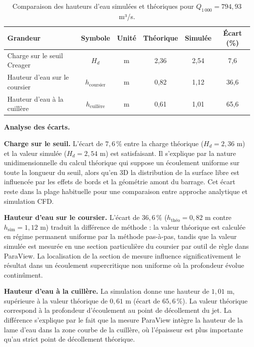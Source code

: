 \begin{table}[H]
\centering
\caption{Comparaison des hauteurs d'eau simulées et théoriques pour $Q_{1\,000} = 794{,}93$ m³/s.}
\label{tab:comparaison_simul_theo}
\renewcommand{\arraystretch}{1.4}
\begin{tabular}{lccccc}
\toprule
\textbf{Grandeur} & \textbf{Symbole} & \textbf{Unité} & \textbf{Théorique} & \textbf{Simulée} & \textbf{Écart (\%)} \\
\midrule
Charge sur le seuil Creager    & $H_d$                     & m & 2,36  & 2,54  &  7,6 \\
Hauteur d'eau sur le coursier  & $h_{\text{coursier}}$     & m & 0,82  & 1,12  & 36,6 \\
Hauteur d'eau à la cuillère    & $h_{\text{cuillère}}$     & m & 0,61  & 1,01  & 65,6 \\
\bottomrule
\end{tabular}
\end{table}

\medskip
\noindent\textbf{Analyse des écarts.}

\medskip
\noindent\textbf{Charge sur le seuil.} L'écart de $7{,}6\,\%$ entre la charge théorique ($H_d = 2{,}36$ m) et la valeur simulée ($H_d = 2{,}54$ m) est satisfaisant. Il s'explique par la nature unidimensionnelle du calcul théorique qui suppose un écoulement uniforme sur toute la longueur du seuil, alors qu'en 3D la distribution de la surface libre est influencée par les effets de bords et la géométrie amont du barrage. Cet écart reste dans la plage habituelle pour une comparaison entre approche analytique et simulation CFD.

\medskip
\noindent\textbf{Hauteur d'eau sur le coursier.} L'écart de $36{,}6\,\%$ ($h_{\text{théo}} = 0{,}82$ m contre $h_{\text{sim}} = 1{,}12$ m) traduit la différence de méthode : la valeur théorique est calculée en régime permanent uniforme par la méthode pas-à-pas, tandis que la valeur simulée est mesurée en une section particulière du coursier par outil de règle dans ParaView. La localisation de la section de mesure influence significativement le résultat dans un écoulement supercritique non uniforme où la profondeur évolue continûment.

\medskip
\noindent\textbf{Hauteur d'eau à la cuillère.} La simulation donne une hauteur de $1{,}01$ m, supérieure à la valeur théorique de $0{,}61$ m (écart de $65{,}6\,\%$). La valeur théorique correspond à la profondeur d'écoulement au point de décollement du jet. La différence s'explique par le fait que la mesure ParaView intègre la hauteur de la lame d'eau dans la zone courbe de la cuillère, où l'épaisseur est plus importante qu'au strict point de décollement théorique.

